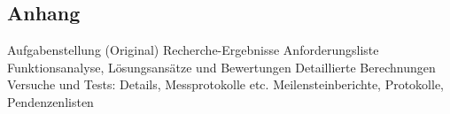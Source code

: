 \documentclass[../../main.tex]{subfiles}
\begin{document}
    \subsection{Anhang}
        Aufgabenstellung (Original)
        Recherche-Ergebnisse
        Anforderungsliste
        Funktionsanalyse, Lösungsansätze und Bewertungen
        Detaillierte Berechnungen
        Versuche und Tests: Details, Messprotokolle etc.
        Meilensteinberichte, Protokolle, Pendenzenlisten
\end{document}
